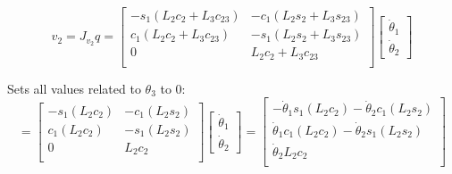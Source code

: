 \documentclass[12pt,norsk,a4paper]{article}
\begin{document}
    \[v_2 = J_{v_2}q = 
    \left[\begin{array}{cc}
        -s_1(L_2c_2+L_3c_{23}) & -c_1(L_2s_2+L_3s_{23})\\
        c_1(L_2c_2+L_3c_{23}) & -s_1(L_2s_2+L_3s_{23})\\
        0 & L_2c_2+L_3c_{23}\\
    \end{array}\right]
    \left[\begin{array}{c}
        \dot\theta_1 \\ \dot\theta_2
    \end{array}\right]\]

    Sets all values related to $\theta_3$ to 0:\\
    \[= \left[\begin{array}{cc}
        -s_1(L_2c_2) & -c_1(L_2s_2)\\
        c_1(L_2c_2) & -s_1(L_2s_2)\\
        0 & L_2c_2\\
    \end{array}\right]
    \left[\begin{array}{c}
        \dot\theta_1 \\ \dot\theta_2
    \end{array}\right]
    = \left[\begin{array}{c}
        -\dot\theta_1s_1(L_2c_2)-\dot\theta_2c_1(L_2s_2)\\
        \dot\theta_1c_1(L_2c_2)-\dot\theta_2s_1(L_2s_2)\\
        \dot\theta_2L_2c_2\\
    \end{array}\right]\]
\end{document}
